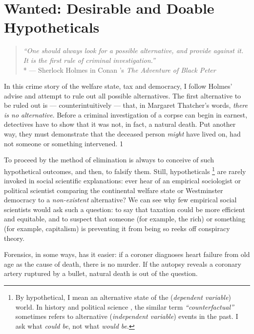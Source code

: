 
\chapter[Wanted]{Wanted: Desirable and Doable Hypotheticals} \label{chap:wanted}

\begin{quote}
	\emph{``One should always look for a possible alternative, and provide against it. It is the first rule of criminal investigation.''}\\*
	--- Sherlock Holmes in Conan \citeauthor{Doyle1904}'s \emph{The Adventure of Black Peter} \citeyearpar[567]{Doyle1904}
\end{quote}

In this crime story of the welfare state, tax and democracy, I follow Holmes' advise and attempt to rule out all possible alternatives. 
The first alternative to be ruled out is --- counterintuitively --- that, in Margaret Thatcher's words, \emph{there is no alternative}. 
Before a criminal investigation of a corpse can begin in earnest, detectives have to show that it was not, in fact, a natural death. 
Put another way, they must demonstrate that the deceased person \emph{might} have lived on, had not someone or something intervened. 1

To proceed by the method of elimination is always to conceive of such hypothetical outcomes, and then, to falsify them. Still, hypotheticals
\footnote{
	By hypothetical, I mean an alternative state of the (\emph{dependent variable}) world. 
	In history \citep[recently reviewed by][]{Bunzl2004} and political science \citep[for a methodological appraisal, see][]{Fearon1991}, the similar term \emph{``counterfactual''} sometimes refers to alternative (\emph{independent variable}) events in the past. I ask what \emph{could be}, not what \emph{would be}.
}
are rarely invoked in social scientific explanations: ever hear of an empirical sociologist or political scientist comparing the continental welfare state \citep{Esping-Andersen-1990-aa} or Westminster democracy \citep{Lijphart-1999-aa} to a \emph{non-existent} alternative? 
We can see why few empirical social scientists would ask such a question: to say that taxation could be more efficient and equitable, and to suspect that someone (for example, the rich) or something (for example, capitalism) is preventing it from being so reeks off conspiracy theory. 

Forensics, in some ways, has it easier: if a coroner diagnoses heart failure from old age as the cause of death, there is no murder. 
If the autopsy reveals a coronary artery ruptured by a bullet, natural death is out of the question.

